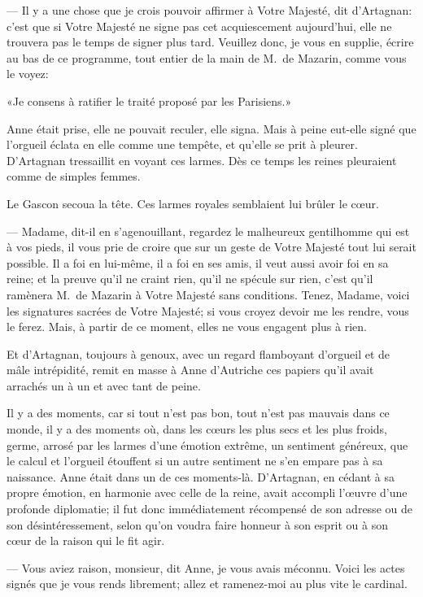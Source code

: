 — Il y a une chose que je crois pouvoir affirmer à Votre Majesté, dit d'Artagnan: c'est que si Votre Majesté ne signe pas cet acquiescement aujourd'hui, elle ne trouvera pas le temps de signer plus tard. Veuillez donc, je vous en supplie, écrire au bas de ce programme, tout entier de la main de M.~de Mazarin, comme vous le voyez:

«Je consens à ratifier le traité proposé par les Parisiens.»

Anne était prise, elle ne pouvait reculer, elle signa. Mais à peine eut-elle signé que l'orgueil éclata en elle comme une tempête, et qu'elle se prit à pleurer. D'Artagnan tressaillit en voyant ces larmes. Dès ce temps les reines pleuraient comme de simples femmes.

Le Gascon secoua la tête. Ces larmes royales semblaient lui brûler le cœur.

— Madame, dit-il en s'agenouillant, regardez le malheureux gentilhomme qui est à vos pieds, il vous prie de croire que sur un geste de Votre Majesté tout lui serait possible. Il a foi en lui-même, il a foi en ses amis, il veut aussi avoir foi en sa reine; et la preuve qu'il ne craint rien, qu'il ne spécule sur rien, c'est qu'il ramènera M.~de Mazarin à Votre Majesté sans conditions. Tenez, Madame, voici les signatures sacrées de Votre Majesté; si vous croyez devoir me les rendre, vous le ferez. Mais, à partir de ce moment, elles ne vous engagent plus à rien.

Et d'Artagnan, toujours à genoux, avec un regard flamboyant d'orgueil et de mâle intrépidité, remit en masse à Anne d'Autriche ces papiers qu'il avait arrachés un à un et avec tant de peine.

Il y a des moments, car si tout n'est pas bon, tout n'est pas mauvais dans ce monde, il y a des moments où, dans les cœurs les plus secs et les plus froids, germe, arrosé par les larmes d'une émotion extrême, un sentiment généreux, que le calcul et l'orgueil étouffent si un autre sentiment ne s'en empare pas à sa naissance. Anne était dans un de ces moments-là. D'Artagnan, en cédant à sa propre émotion, en harmonie avec celle de la reine, avait accompli l'œuvre d'une profonde diplomatie; il fut donc immédiatement récompensé de son adresse ou de son désintéressement, selon qu'on voudra faire honneur à son esprit ou à son cœur de la raison qui le fit agir.

— Vous aviez raison, monsieur, dit Anne, je vous avais méconnu. Voici les actes signés que je vous rends librement; allez et ramenez-moi au plus vite le cardinal.

